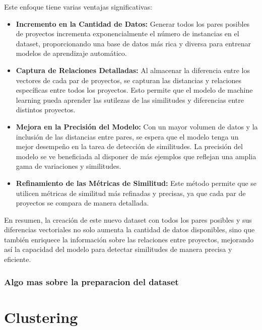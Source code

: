 Este enfoque tiene varias ventajas significativas:

\begin{itemize}
	\item {\bf Incremento en la Cantidad de Datos:} Generar todos los pares posibles de proyectos incrementa exponencialmente el número de instancias en el dataset, proporcionando una base de datos más rica y diversa para entrenar modelos de aprendizaje automático.

	\item {\bf Captura de Relaciones Detalladas:} Al almacenar la diferencia entre los vectores de cada par de proyectos, se capturan las distancias y relaciones específicas entre todos los proyectos. Esto permite que el modelo de machine learning pueda aprender las sutilezas de las similitudes y diferencias entre distintos proyectos.
	
	\item {\bf Mejora en la Precisión del Modelo:} Con un mayor volumen de datos y la inclusión de las distancias entre pares, se espera que el modelo tenga un mejor desempeño en la tarea de detección de similitudes. La precisión del modelo se ve beneficiada al disponer de más ejemplos que reflejan una amplia gama de variaciones y similitudes.
	
	\item {\bf Refinamiento de las Métricas de Similitud:} Este método permite que se utilicen métricas de similitud más refinadas y precisas, ya que cada par de proyectos se compara de manera detallada. 

\end{itemize}

En resumen, la creación de este nuevo dataset con todos los pares posibles y sus diferencias vectoriales no solo aumenta la cantidad de datos disponibles, sino que también enriquece la información sobre las relaciones entre proyectos, mejorando así la capacidad del modelo para detectar similitudes de manera precisa y eficiente.  

\subsubsection{Algo mas sobre la preparacion del dataset}


\section{Clustering}



